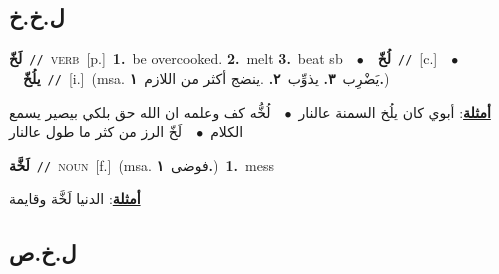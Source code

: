 \documentclass[10pt,a4paper,twoside]{article} %
\begin{document}
\begin{multicols}{2}
\vspace{-3mm}
\subsection*{\color{blue}\foreignlanguage{arabic}{ل.خ.خ}\color{blue}{}} 

{\setlength\topsep{0pt}\textbf{\foreignlanguage{arabic}{لَخّ}}\ {\color{gray}\texttt{//}\color{black}}\ \textsc{verb}\ [p.]\ \textbf{1.}~be overcooked.  \textbf{2.}~melt  \textbf{3.}~beat sb\ \ $\bullet$\ \ \setlength\topsep{0pt}\textbf{\foreignlanguage{arabic}{لُخّ}}\ {\color{gray}\texttt{//}\color{black}}\ [c.]\ \ $\bullet$\ \ \setlength\topsep{0pt}\textbf{\foreignlanguage{arabic}{يلُخّ}}\ {\color{gray}\texttt{//}\color{black}}\ [i.]\ \color{gray}(msa. \foreignlanguage{arabic}{يَضْرِب}~\foreignlanguage{arabic}{\textbf{٣.}}  \foreignlanguage{arabic}{يذوِّب}~\foreignlanguage{arabic}{\textbf{٢.}}  .\foreignlanguage{arabic}{ينضج أكثر من اللازم}~\foreignlanguage{arabic}{\textbf{١.}})\color{black}\  \begin{flushright}\color{gray}\foreignlanguage{arabic}{\textbf{\underline{\foreignlanguage{arabic}{أمثلة}}}: أبوي كان يلُخ السمنة عالنار\ $\bullet$\ \  لُخُّه كف وعلمه ان الله حق بلكي بيصير يسمع الكلام\ $\bullet$\ \  لَخّ الرز من كثر ما طول عالنار}\end{flushright}\color{black}} \vspace{2mm}

{\setlength\topsep{0pt}\textbf{\foreignlanguage{arabic}{لَخَّة}}\ {\color{gray}\texttt{//}\color{black}}\ \textsc{noun}\ [f.]\ \color{gray}(msa. \foreignlanguage{arabic}{فوضى}~\foreignlanguage{arabic}{\textbf{١.}})\color{black}\ \textbf{1.}~mess\  \begin{flushright}\color{gray}\foreignlanguage{arabic}{\textbf{\underline{\foreignlanguage{arabic}{أمثلة}}}: الدنيا لَخَّة وقايمة}\end{flushright}\color{black}} \vspace{2mm}

\vspace{-3mm}
\subsection*{\color{blue}\foreignlanguage{arabic}{ل.خ.ص}\color{blue}{}} 


\end{multicols}
\end{document}

